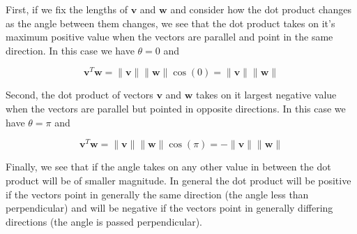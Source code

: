 \documentclass[12pt]{article}
\newcommand{\nin}{\noindent}
\newcommand{\vthree}{\vspace{3mm}}
\newcommand{\myp}[1]{\left( #1 \right)}
\newcommand{\bw}{\mathbf{w}}
\newcommand{\bv}{\mathbf{v}}
\begin{document}
\vthree

\nin First, if we fix the lengths of $\bv$ and $\bw$ and consider how the dot product changes as the angle between them changes, we see that the dot product takes on it's maximum positive value when the vectors are parallel and point in the same direction.  In this case we have $\theta = 0$ and

\[
\bv^T\bw = \|\bv\|\|\bw\|\cos\myp{0} = \|\bv\|\|\bw\|
\]

\vthree

\nin Second, the dot product of vectors $\bv$ and $\bw$ takes on it largest negative value when the vectors are parallel but pointed in opposite directions.  In this case we have $\theta = \pi$ and

\[
\bv^T\bw = \|\bv\|\|\bw\|\cos\myp{\pi} = -\|\bv\|\|\bw\|
\]

\vthree

\nin Finally, we see that if the angle takes on any other value in between the dot product will be of smaller magnitude.  In general the dot product will be positive if the vectors point in generally the same direction (the angle less than perpendicular) and will be negative if the vectors point in generally differing directions (the angle is passed perpendicular).

\vthree
\end{document}
